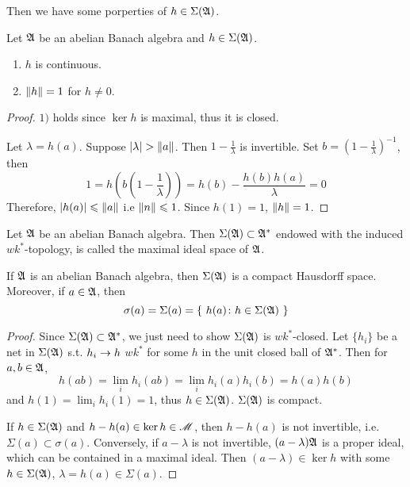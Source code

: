 Then we have some porperties of $h \in \Sigma(\mathfrak{A})$.

\begin{prop} \label{prop5}
	Let $\mathfrak{A}$ be an abelian Banach algebra and $h \in \Sigma(\mathfrak{A})$.
	\begin{enumerate}[label=\arabic*)]
		\item $h$ is continuous.
		\item $\left\lVert h\right\lVert=1$ for $h \neq 0$.
	\end{enumerate}
\end{prop}
\begin{proof}
	$1)$ holds since $\ker{h}$ is maximal, thus it is closed.
	\item Let $\lambda = h(a)$. Suppose $\left\lvert\lambda\right\lvert > \left\lVert a\right\lVert$. Then $1-\frac{1}{\lambda}$ is invertible. Set $b = (1-\frac{1}{\lambda})^{-1}$, then 
	\begin{equation*}
		1=h(b(1-\frac{1}{\lambda})) = h(b) - \frac{h(b)h(a)}{\lambda} =0
	\end{equation*}
	Therefore, $\left\lvert h(a)\right\lvert \leqslant \left\lVert a\right\lVert$ i.e $\left\lVert n\right\lVert \leqslant 1$. Since $h(1) = 1$, $\left\lVert h\right\lVert=1$.
\end{proof}

\begin{defn}
	Let $\mathfrak{A}$ be an abelian Banach algebra. Then $\Sigma(\mathfrak{A}) \subset \mathfrak{A}^{*}$ endowed with the induced $wk^{*}$-topology, is called the maximal ideal space of $\mathfrak{A}$.
\end{defn}

\begin{prop} \label{prop6}
	If $\mathfrak{A}$ is an abelian Banach algebra, then $\Sigma(\mathfrak{A})$ is a compact Hausdorff space. Moreover, if $a \in \mathfrak{A}$, then
	\begin{equation*}
		\sigma(a) = \Sigma(a) = \{~ h(a) \colon h \in \Sigma(\mathfrak{A}) ~\}
	\end{equation*}
\end{prop}
\begin{proof}
	Since $\Sigma(\mathfrak{A}) \subset \mathfrak{A}^{*}$, we just need to show $\Sigma(\mathfrak{A})$ is $wk^{*}$-closed. Let $\{h_i\}$ be a net in $\Sigma(\mathfrak{A})$ s.t. $h_i \rightarrow h$ $wk^{*}$ for some $h$ in the unit closed ball of $\mathfrak{A}^{*}$. Then for $a,b \in \mathfrak{A}$,
	\begin{equation*}
		h(ab) = \lim_{i} h_i(ab) = \lim_{i} h_i(a)h_i(b) = h(a)h(b)
	\end{equation*}
	and $h(1)=\lim_{i}h_i(1)=1$, thus $h \in \Sigma(\mathfrak{A})$. $\Sigma(\mathfrak{A})$ is compact.
	\item If $h\in \Sigma(\mathfrak{A})$ and $h-h(a) \in \ker{h} \in \mathscr{M}$, then $h-h(a)$ is not invertible, i.e. $\Sigma(a) \subset \sigma(a)$. Conversely, if $a-\lambda$ is not invertible, $(a-\lambda)\mathfrak{A}$ is a proper ideal, which can be contained in a maximal ideal. Then $(a-\lambda) \in \ker{h}$ with some $h \in \Sigma(\mathfrak{A})$, $\lambda = h(a) \in \Sigma(a)$.
\end{proof}

